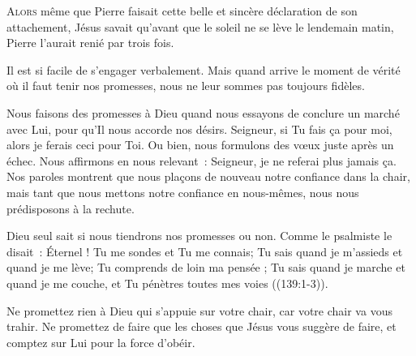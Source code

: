 


\lettrine{A}{lors} même que Pierre faisait cette belle
 et sincère déclaration de son attachement,
 Jésus savait qu'avant que le soleil ne se lève le lendemain matin,
 Pierre l'aurait renié par trois fois.

Il est si facile de s'engager verbalement.
 Mais quand arrive le moment de vérité où il faut tenir nos promesses,
 nous ne leur sommes pas toujours fidèles.


Nous faisons des promesses à Dieu quand nous essayons de conclure
 un marché avec Lui, pour qu'Il nous accorde nos désirs.
 \og Seigneur, si Tu fais ça pour moi, alors je ferais ceci pour Toi. \fg{}
 Ou bien,  nous formulons des v\oe{}ux juste après un échec.
 Nous affirmons en nous relevant~: 
 \og Seigneur, je ne referai plus jamais ça. \fg{}
 Nos paroles montrent que nous plaçons de nouveau notre confiance
 dans la chair, mais tant que nous mettons notre confiance en nous-mêmes,
 nous nous prédisposons à la rechute.

Dieu seul sait si nous tiendrons nos promesses ou non.
 Comme le psalmiste le disait~: 
 \og Éternel ! Tu me sondes et Tu me connais; Tu sais quand je m'assieds
 et quand je me lève; Tu comprends de loin ma pensée ;
 Tu sais quand je marche et quand je me couche,
 et Tu pénètres toutes mes voies \fg{} ((139:1-3)).

Ne promettez rien à Dieu qui s'appuie sur votre chair,
 car votre chair va vous trahir.
 Ne promettez de faire que les choses que Jésus vous suggère de faire,
 et comptez sur Lui pour la force d'obéir.

\dvrule






